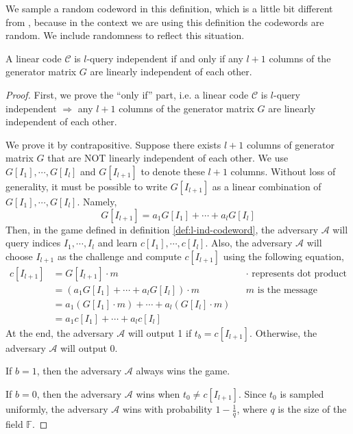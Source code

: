 We sample a random codeword in this definition, which is a little bit different from \cite{BCL22}, because in the context we are using this definition the codewords are random. We include randomness to reflect this situation.

\begin{lemma}
\label{lemma:lquery-zk}

A linear code $\mathcal{C}$ is $l$-query independent if and only if any $l+1$ columns of the generator matrix $G$ are linearly independent of each other.

\end{lemma}

\begin{proof}
First, we prove the ``only if'' part, i.e. a linear code $\mathcal{C}$ is $l$-query independent $\Rightarrow$ any $l+1$ columns of the generator matrix $G$ are linearly independent of each other.

We prove it by contrapositive. Suppose there exists $l+1$ columns of generator matrix $G$ that are NOT linearly independent of each other. We use $G[I_1], \cdots, G[I_l]$ and $G[I_{l+1}]$ to denote these $l+1$ columns. Without loss of generality, it must be possible to write $G[I_{l+1}]$ as a linear combination of $G[I_1], \cdots, G[I_l]$. Namely, 
$$
    G[I_{l+1}] = a_{1}G[I_1] + \cdots + a_{l}G[I_l]
$$
Then, in the game defined in definition \ref{def:l-ind-codeword}, the adversary $\mathcal{A}$ will query indices $I_1, \cdots, I_l$ and learn $c[I_1], \cdots, c[I_l]$. Also, the adversary $\mathcal{A}$ will choose $I_{l+1}$ as the challenge and compute $c[I_{l+1}]$ using the following equation,
\begin{align}
c[I_{l+1}] 
    &= G[I_{l+1}] \cdot m  
    && \cdot \text{ represents dot product} \nonumber \\
    &= (a_{1}G[I_1] + \cdots + a_{l}G[I_l]) \cdot m 
    &&  m \text{ is the message} \nonumber \\
    &= a_{1}(G[I_1]\cdot m) + \cdots + a_{l}(G[I_l]\cdot m) \nonumber \\
    &= a_1 c[I_1] + \cdots + a_{l} c[I_l] \nonumber
\end{align}
At the end, the adversary $\mathcal{A}$ will output 1 if $t_b = c[I_{l+1}]$. Otherwise, the adversary $\mathcal{A}$ will output 0. 

If $b = 1$, then the adversary $\mathcal{A}$ always wins the game. 

If $b=0$, then the adversary $\mathcal{A}$ wins when $t_0 \neq c[I_{l+1}]$. Since $t_0$ is sampled uniformly, the adversary $\mathcal{A}$ wins with probability $1 - \frac{1}{q}$, where $q$ is the size of the field $\mathbb{F}$. 


\end{proof}
